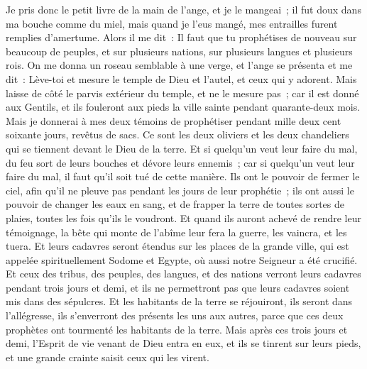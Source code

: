\begin{multicols}{2}
Je pris donc le petit livre de la main de l'ange, et je le mangeai~; il fut doux dans ma bouche comme du miel, mais quand je l'eus mangé, mes entrailles furent remplies d'amertume.
Alors il me dit~: Il faut que tu prophétises de nouveau sur beaucoup de peuples, et sur plusieurs nations, sur plusieurs langues et plusieurs rois.
\VerseOne{}On me donna un roseau semblable à une verge, et l'ange se présenta et me dit~: Lève-toi et mesure le temple de Dieu et l'autel, et ceux qui y adorent.
Mais laisse de côté le parvis extérieur du temple, et ne le mesure pas~; car il est donné aux Gentils, et ils fouleront aux pieds la ville sainte pendant quarante-deux mois.
Mais je donnerai à mes deux témoins de prophétiser pendant mille deux cent soixante jours, revêtus de sacs.
Ce sont les deux oliviers et les deux chandeliers qui se tiennent devant le Dieu de la terre. 
Et si quelqu'un veut leur faire du mal, du feu sort de leurs bouches et dévore leurs ennemis~; car si quelqu'un veut leur faire du mal, il faut qu'il soit tué de cette manière.
Ils ont le pouvoir de fermer le ciel, afin qu'il ne pleuve pas pendant les jours de leur prophétie~; ils ont aussi le pouvoir de changer les eaux en sang, et de frapper la terre de toutes sortes de plaies, toutes les fois qu'ils le voudront.
Et quand ils auront achevé de rendre leur témoignage, la bête qui monte de l'abîme leur fera la guerre, les vaincra, et les tuera.
Et leurs cadavres seront étendus sur les places de la grande ville, qui est appelée spirituellement Sodome et Egypte, où aussi notre Seigneur a été crucifié.
Et ceux des tribus, des peuples, des langues, et des nations verront leurs cadavres pendant trois jours et demi, et ils ne permettront pas que leurs cadavres soient mis dans des sépulcres.
Et les habitants de la terre se réjouiront, ils seront dans l'allégresse, ils s'enverront des présents les uns aux autres, parce que ces deux prophètes ont tourmenté les habitants de la terre.
Mais après ces trois jours et demi, l'Esprit de vie venant de Dieu entra en eux, et ils se tinrent sur leurs pieds, et une grande crainte saisit ceux qui les virent.

\end{multicols}
